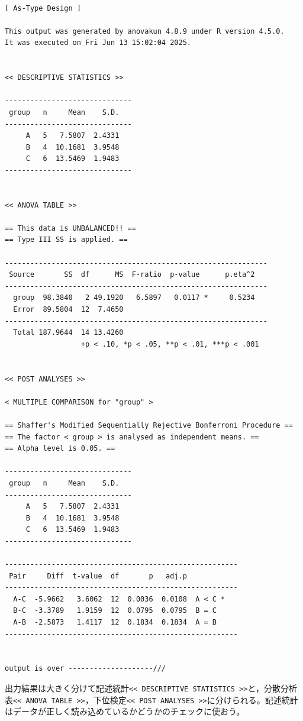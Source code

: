 \documentclass[
  a4paper,
]{ltjsbook}
\begin{document}
\begin{verbatim}

[ As-Type Design ]

This output was generated by anovakun 4.8.9 under R version 4.5.0.
It was executed on Fri Jun 13 15:02:04 2025.

 
<< DESCRIPTIVE STATISTICS >>

------------------------------
 group   n     Mean    S.D. 
------------------------------
     A   5   7.5807  2.4331 
     B   4  10.1681  3.9548 
     C   6  13.5469  1.9483 
------------------------------


<< ANOVA TABLE >>

== This data is UNBALANCED!! ==
== Type III SS is applied. ==

--------------------------------------------------------------
 Source       SS  df      MS  F-ratio  p-value      p.eta^2 
--------------------------------------------------------------
  group  98.3840   2 49.1920   6.5897   0.0117 *     0.5234 
  Error  89.5804  12  7.4650                                
--------------------------------------------------------------
  Total 187.9644  14 13.4260                                
                  +p < .10, *p < .05, **p < .01, ***p < .001


<< POST ANALYSES >>

< MULTIPLE COMPARISON for "group" >

== Shaffer's Modified Sequentially Rejective Bonferroni Procedure ==
== The factor < group > is analysed as independent means. == 
== Alpha level is 0.05. == 
 
------------------------------
 group   n     Mean    S.D. 
------------------------------
     A   5   7.5807  2.4331 
     B   4  10.1681  3.9548 
     C   6  13.5469  1.9483 
------------------------------

-------------------------------------------------------
 Pair     Diff  t-value  df       p   adj.p          
-------------------------------------------------------
  A-C  -5.9662   3.6062  12  0.0036  0.0108  A < C * 
  B-C  -3.3789   1.9159  12  0.0795  0.0795  B = C   
  A-B  -2.5873   1.4117  12  0.1834  0.1834  A = B   
-------------------------------------------------------


output is over --------------------///
\end{verbatim}

出力結果は大きく分けて記述統計\texttt{\textless{}\textless{}\ DESCRIPTIVE\ STATISTICS\ \textgreater{}\textgreater{}}と，分散分析表\texttt{\textless{}\textless{}\ ANOVA\ TABLE\ \textgreater{}\textgreater{}}，下位検定\texttt{\textless{}\textless{}\ POST\ ANALYSES\ \textgreater{}\textgreater{}}に分けられる。記述統計はデータが正しく読み込めているかどうかのチェックに使おう。
\end{document}
